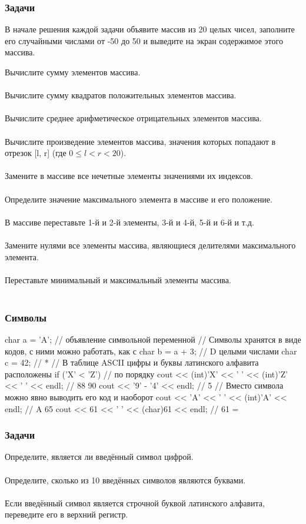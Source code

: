\documentclass[PDF,10pt,usenames,dvipsnames,t,fragile]{beamer}
\newcommand{\bigqm}[1][1]{\text{\rm\larger[#1]{\textbf{?}}}}
\newcommand{\prblm}[1]{{\bigqm[1]} {#1 \\} \vspace{-6pt} \\} %
\begin{document}
\begin{frame}
	\frametitle{Задачи}
	В начале решения каждой задачи объявите массив из 20 целых чисел, заполните
	его случайными числами от -50 до 50 и выведите на экран содержимое этого
	массива.

	\prblm{Вычислите сумму элементов массива.}
	\prblm{Вычислите сумму квадратов положительных элементов массива.}
	\prblm{Вычислите среднее арифметическое отрицательных элементов массива.}
	\prblm{Вычислите произведение элементов массива, значения которых попадают в отрезок [l, r] (где $0 \leq l < r < 20$).}
	\prblm{Замените в массиве все нечетные элементы значениями их индексов.}
	\prblm{Определите значение максимального элемента в массиве и его положение.}
	\prblm{В массиве переставьте 1-й и 2-й элементы, 3-й и 4-й, 5-й и 6-й и т.д.}
	\prblm{Замените нулями все элементы массива, являющиеся делителями максимального элемента.}
	\prblm{Переставьте минимальный и максимальный элементы массива.}
\end{frame}

\begin{frame}[fragile]
	\frametitle{Символы}
	\begin{code}
char a = 'A'; // объявление символьной переменной
// Символы хранятся в виде кодов, с ними можно работать, как с
char b = a + 3; // D                            целыми числами
char c = 42; // *
// В таблице ASCII цифры и буквы латинского алфавита расположены
if ('X' < 'Z') //                                     по порядку
	cout << (int)'X' << ' ' << (int)'Z' << ' ' << endl; // 88 90
cout << '9' - '4' << endl; // 5
// Вместо символа можно явно выводить его код и наоборот
cout << 'A' << ' ' << (int)'A' << endl; // A 65
cout << 61  << ' ' << (char)61 << endl; // 61 =
	\end{code}
\end{frame}

\begin{frame}
	\frametitle{Задачи}
	\prblm{Определите, является ли введённый символ цифрой.}
	\prblm{Определите, сколько из 10 введённых символов являются буквами.}
	\prblm{Если введённый символ является строчной буквой латинского алфавита, переведите его в верхний регистр.}
\end{frame}
\end{document}
